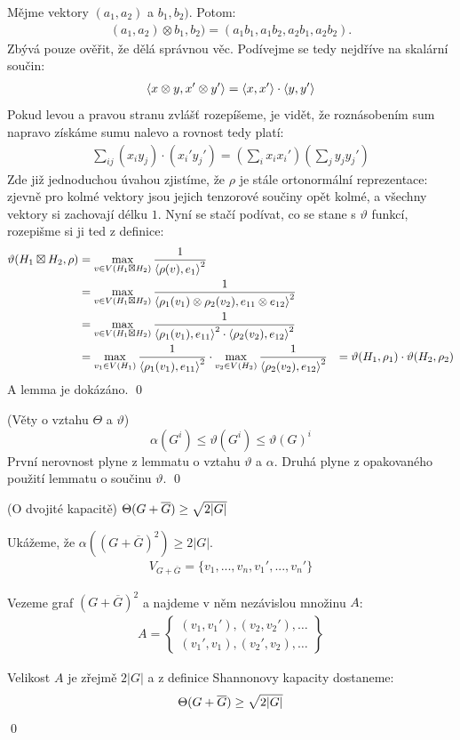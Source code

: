 \pr Mějme vektory $(a_1, a_2)$ a $b_1, b_2)$. Potom:
\begin{align}
	(a_1, a_2) \otimes b_1, b_2) = (a_1 b_1, a_1 b_2, a_2 b_1, a_2 b_2).
\end{align}
Zbývá pouze ověřit, že dělá správnou věc. Podívejme se tedy nejdříve na skalární 
součin:
\begin{align}
	{\langle x \otimes y , x' \otimes y'\rangle} = {\langle x,x'\rangle} \cdot {\langle y,y'\rangle}
\end{align}
Pokud levou a pravou stranu zvlášť rozepíšeme, je vidět, že roznásobením sum 
napravo získáme sumu nalevo a rovnost tedy platí:
\begin{align}
	\sum_{ij} (x_iy_j) \cdot (x_i' y_j') = \left( \sum_i x_ix_i'\right) \left(\sum_j 
	y_jy_j' \right)
\end{align}
Zde již jednoduchou úvahou zjistíme, že $\rho$ je stále ortonormální 
reprezentace: zjevně pro kolmé vektory jsou jejich tenzorové součiny opět kolmé, a všechny vektory si 
zachovají délku $1$. Nyní se stačí podívat, co se stane s $\vartheta$ funkcí, 
rozepišme si ji ted z definice:
\begin{align*}
	\vartheta(H_1 \boxtimes H_2, \rho) &= \max_{v\in V(H_1 \boxtimes H_2)} { 1 
	\over {\langle \rho(v) , e_1\rangle}^2} \\
	&= \max_{v\in V(H_1 \boxtimes H_2)} { 1 \over {\langle \rho_1(v_1)\otimes \rho_2(v_2) , e_{11} \otimes e_{12}\rangle}^2} \\
	&= \max_{v\in V(H_1 \boxtimes H_2)} { 1 \over {\langle \rho_1(v_1) , e_{11}\rangle}^2
		\cdot {\langle \rho_2(v_2) , e_{12}\rangle}^2} \\
	&= \max_{v_1\in V(H_1)} { 1 \over {\langle \rho_1(v_1) , e_{11}\rangle}^2} \cdot
	  \max_{v_2\in V(H_2)} { 1 \over {\langle \rho_2(v_2) , e_{12}\rangle}^2} 
	&= \vartheta(H_1,\rho_1) \cdot \vartheta(H_2, \rho_2)
\end{align*}
A lemma je dokázáno. \qed


\dk (Věty o vztahu $\Theta$ a $\vartheta$)  $$\alpha(G^i) \le \vartheta(G^i) \le \vartheta(G)^i$$
První nerovnost plyne z lemmatu o vztahu $\vartheta$ a $\alpha$. Druhá plyne z
opakovaného použití lemmatu o součinu $\vartheta$.
\qed


\lm (O dvojité kapacitě) $\Theta(G + \overline{G}) \ge \sqrt{2|G|}$

\dk Ukážeme, že $\alpha ((G+\overline G)^2) \geq 2|G|$.
\begin{align*}
	V_{G+\overline G} = \{ v_1, ..., v_n, v_1', ..., v_n'\}
\end{align*}

Vezeme graf $(G+\overline G)^2$ a najdeme v něm nezávislou množinu $A$:
\begin{align*}
	A = \left\{\begin{matrix}
		(v_1, v_1'), (v_2, v_2'), \dots \\
		(v_1', v_1), (v_2', v_2), \dots
		\end{matrix}\right\}
\end{align*}

Velikost $A$ je zřejmě $2|G|$ a z definice Shannonovy kapacity dostaneme:
$$\Theta(G + \overline{G}) \ge \sqrt{2|G|}$$
\qed


